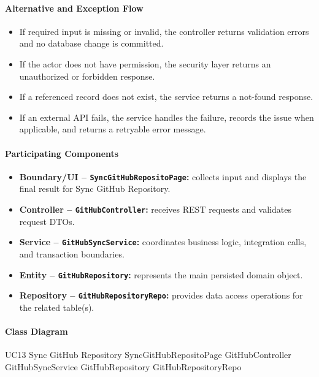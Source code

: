 \paragraph{Alternative and Exception Flow}

\begin{itemize}
    \item If required input is missing or invalid, the controller returns validation errors and no database change is committed.
    \item If the actor does not have permission, the security layer returns an unauthorized or forbidden response.
    \item If a referenced record does not exist, the service returns a not-found response.
    \item If an external API fails, the service handles the failure, records the issue when applicable, and returns a retryable error message.
\end{itemize}

\paragraph{Participating Components}

\begin{itemize}
    \item \textbf{Boundary/UI -- \texttt{SyncGitHubRepositoPage}:} collects input and displays the final result for Sync GitHub Repository.
    \item \textbf{Controller -- \texttt{GitHubController}:} receives REST requests and validates request DTOs.
    \item \textbf{Service -- \texttt{GitHubSyncService}:} coordinates business logic, integration calls, and transaction boundaries.
    \item \textbf{Entity -- \texttt{GitHubRepository}:} represents the main persisted domain object.
    \item \textbf{Repository -- \texttt{GitHubRepositoryRepo}:} provides data access operations for the related table(s).
\end{itemize}

\paragraph{Class Diagram}

\ClassDiagram
{UC13 Sync GitHub Repository}
{SyncGitHubRepositoPage}
{GitHubController}
{GitHubSyncService}
{GitHubRepository}
{GitHubRepositoryRepo}


